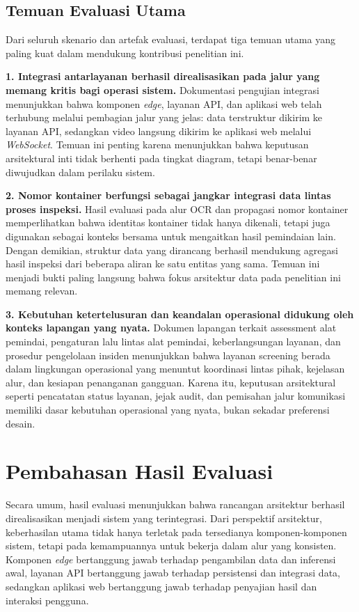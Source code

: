 \subsection{Temuan Evaluasi Utama}
\label{subsec:temuan-evaluasi-utama}

Dari seluruh skenario dan artefak evaluasi, terdapat tiga temuan utama yang
paling kuat dalam mendukung kontribusi penelitian ini.

\textbf{1. Integrasi antarlayanan berhasil direalisasikan pada jalur yang
memang kritis bagi operasi sistem.}
Dokumentasi pengujian integrasi menunjukkan bahwa komponen \textit{edge},
layanan API, dan aplikasi web telah terhubung melalui pembagian jalur yang
jelas: data terstruktur dikirim ke layanan API, sedangkan video langsung
dikirim ke aplikasi web melalui \textit{WebSocket}. Temuan ini penting karena
menunjukkan bahwa keputusan arsitektural inti tidak berhenti pada tingkat
diagram, tetapi benar-benar diwujudkan dalam perilaku sistem.

\textbf{2. Nomor kontainer berfungsi sebagai jangkar integrasi data lintas
proses inspeksi.}
Hasil evaluasi pada alur OCR dan propagasi nomor kontainer memperlihatkan bahwa
identitas kontainer tidak hanya dikenali, tetapi juga digunakan sebagai konteks
bersama untuk mengaitkan hasil pemindaian lain. Dengan demikian, struktur data
yang dirancang berhasil mendukung agregasi hasil inspeksi dari beberapa aliran
ke satu entitas yang sama. Temuan ini menjadi bukti paling langsung bahwa fokus
arsitektur data pada penelitian ini memang relevan.

\textbf{3. Kebutuhan ketertelusuran dan keandalan operasional didukung oleh
konteks lapangan yang nyata.}
Dokumen lapangan terkait assessment alat pemindai, pengaturan lalu lintas alat
pemindai, keberlangsungan layanan, dan prosedur pengelolaan insiden menunjukkan
bahwa layanan screening berada dalam lingkungan operasional yang menuntut
koordinasi lintas pihak, kejelasan alur, dan kesiapan penanganan gangguan.
Karena itu, keputusan arsitektural seperti pencatatan status layanan, jejak
audit, dan pemisahan jalur komunikasi memiliki dasar kebutuhan operasional yang
nyata, bukan sekadar preferensi desain.

\section{Pembahasan Hasil Evaluasi}
\label{sec:pembahasan-hasil-evaluasi}

Secara umum, hasil evaluasi menunjukkan bahwa rancangan arsitektur berhasil
direalisasikan menjadi sistem yang terintegrasi. Dari perspektif arsitektur,
keberhasilan utama tidak hanya terletak pada tersedianya komponen-komponen
sistem, tetapi pada kemampuannya untuk bekerja dalam alur yang konsisten.
Komponen \textit{edge} bertanggung jawab terhadap pengambilan data dan inferensi
awal, layanan API bertanggung jawab terhadap persistensi dan integrasi data,
sedangkan aplikasi web bertanggung jawab terhadap penyajian hasil dan interaksi
pengguna.

